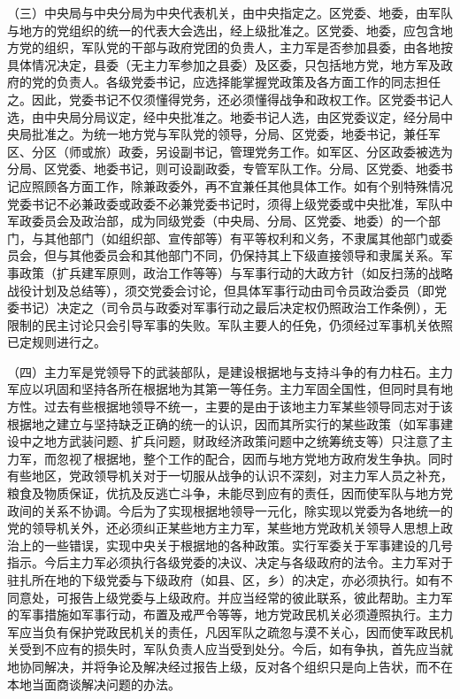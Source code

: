 （三）中央局与中央分局为中央代表机关，由中央指定之。区党委、地委，由军队与地方的党组织的统一的代表大会选出，经上级批准之。区党委、地委，应包含地方党的组织，军队党的干部与政府党团的负贵人，主力军是否参加县委，由各地按具体情况决定，县委（无主力军参加之县委）及区委，只包括地方党，地方军及政府的党的负责人。各级党委书记，应选择能掌握党政策及各方面工作的同志担任之。因此，党委书记不仅须懂得党务，还必须懂得战争和政权工作。区党委书记人选，由中央局分局议定，经中央批准之。地委书记人选，由区党委议定，经分局中央局批准之。为统一地方党与军队党的领导，分局、区党委，地委书记，兼任军区、分区（师或旅）政委，另设副书记，管理党务工作。如军区、分区政委被选为分局、区党委、地委书记，则可设副政委，专管军队工作。分局、区党委、地委书记应照顾各方面工作，除兼政委外，再不宜兼任其他具体工作。如有个别特殊情况党委书记不必兼政委或政委不必兼党委书记时，须得上级党委或中央批准，军队中军政委员会及政治部，成为同级党委（中央局、分局、区党委、地委）的一个部门，与其他部门（如组织部、宣传部等）有平等权利和义务，不隶属其他部门或委员会，但与其他委员会和其他部门不同，仍保持其上下级直接领导和隶属关系。军事政策（扩兵建军原则，政治工作等等）与军事行动的大政方针（如反扫荡的战略战役计划及总结等），须交党委会讨论，但具体军事行动由司令员政治委员（即党委书记）决定之（司令员与政委对军事行动之最后决定权仍照政治工作条例），无限制的民主讨论只会引导军事的失败。军队主要人的任免，仍须经过军事机关依照已定规则进行之。

（四）主力军是党领导下的武装部队，是建设根据地与支持斗争的有力柱石。主力军应以巩固和坚持各所在根据地为其第一等任务。主力军固全国性，但同时具有地方性。过去有些根据地领导不统一，主要的是由于该地主力军某些领导同志对于该根据地之建立与坚持缺乏正确的统一的认识，因而其所实行的某些政策（如军事建设中之地方武装问题、扩兵问题，财政经济政策问题中之统筹统支等）只注意了主力军，而忽视了根据地，整个工作的配合，因而与地方党地方政府发生争执。同时有些地区，党政领导机关对于一切服从战争的认识不深刻，对主力军人员之补充，粮食及物质保证，优抗及反逃亡斗争，未能尽到应有的责任，因而使军队与地方党政间的关系不协调。今后为了实现根据地领导一元化，除实现以党委为各地统一的党的领导机关外，还必须纠正某些地方主力军，某些地方党政机关领导人思想上政治上的一些错误，实现中央关于根据地的各种政策。实行军委关于军事建设的几号指示。今后主力军必须执行各级党委的决议、决定与各级政府的法令。主力军对于驻扎所在地的下级党委与下级政府（如县、区，乡）的决定，亦必须执行。如有不同意处，可报告上级党委与上级政府。并应当经常的彼此联系，彼此帮助。主力军的军事措施如军事行动，布置及戒严令等等，地方党政民机关必须遵照执行。主力军应当负有保护党政民机关的责任，凡因军队之疏忽与漠不关心，因而使军政民机关受到不应有的损失时，军队负责人应当受到处分。今后，如有争执，首先应当就地协同解决，并将争论及解决经过报告上级，反对各个组织只是向上告状，而不在本地当面商谈解决问题的办法。

